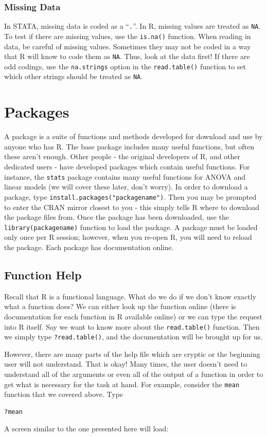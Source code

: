 \documentclass[11pt,letterpaper,fleqn]{report}
\begin{document}
\subsection{Missing Data}
In STATA, missing data is coded as a ``\texttt{.}''. In R, missing values are treated as \texttt{NA}. To test if there are missing values, use the \texttt{is.na()} function. When reading in data, be careful of missing values. Sometimes they may not be coded in a way that R will know to code them as \texttt{NA}. Thus, look at the data first! If there are odd codings, use the \texttt{na.strings} option in the \texttt{read.table()} function to set which other strings should be treated as \texttt{NA}.
\chapter{Packages}
A package is a suite of functions and methods developed for download and use by anyone who has R. The base package includes many useful functions, but often these aren't enough. Other people - the original developers of R, and other dedicated users - have developed packages which contain useful functions. For instance, the \texttt{stats} package contains many useful functions for ANOVA and linear models (we will cover these later, don't worry). In order to download a package, type \texttt{install.packages("packagename")}. Then you may be prompted to enter the CRAN mirror closest to you - this simply tells R where to download the package files from. Once the package has been downloaded, use the \texttt{library(packagename)} function to load the package. A package must be loaded only once per R session; however, when you re-open R, you will need to reload the package. Each package has documentation online.
\section{Function Help}
Recall that R is a functional language. What do we do if we don't know exactly what a function does? We can either look up the function online (there is documentation for each function in R available online) or we can type the request into R itself. Say we want to know more about the \texttt{read.table()} function. Then we simply type \texttt{?read.table()}, and the documentation will be brought up for us.

However, there are many parts of the help file which are cryptic or the beginning user will not understand. That is okay! Many times, the user doesn't need to understand all of the arguments or even all of the output of a function in order to get what is necessary for the task at hand. For example, consider the \texttt{mean} function that we covered above. Type 
\begin{verbatim}
?mean
\end{verbatim}
A screen similar to the one presented here will load:
\end{document}
